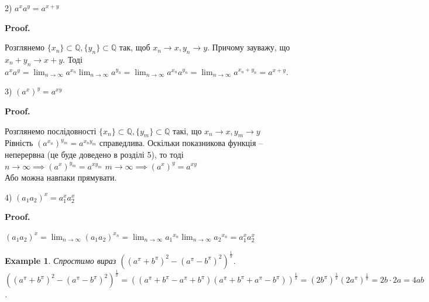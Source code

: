 \documentclass[a4paper, 14pt]{article}
\makeatletter
\def\qed{$\blacksquare$}
\theoremstyle{theoremdd}
\theoremstyle{theoremdd}
\theoremstyle{theoremdd}
\theoremstyle{theoremdd}
\newtheorem{example}[theorem]{Example}
\theoremstyle{theoremdd}
\theoremstyle{theoremdd}
\theoremstyle{theoremdd}
\theoremstyle{theoremdd}
\renewenvironment{proof}[1][Proof.\\]{\par
\pushQED{\hfill \qed}%
\normalfont \topsep6\p@\@plus6\p@\relax
\trivlist
\item\relax
{\bfseries
#1\@addpunct{.}}\hspace\labelsep\ignorespaces
}{%
\popQED\endtrivlist\@endpefalse
}
\makeatother
\begin{document}
2) $a^x a^y = a^{x+y}$
\begin{proof}
Розглянемо $\{x_n\} \subset \mathbb{Q}, \{y_n\} \subset \mathbb{Q}$ так, щоб $x_n \to x, y_n \to y$. Причому зауважу, що $x_n + y_n \to x +y$. Тоді $a^x a^y = \displaystyle\lim_{n \to \infty} a^{x_n} \displaystyle\lim_{n \to \infty} a^{y_n} = \displaystyle\lim_{n \to \infty} a^{x_n} a^{y_n} = \displaystyle\lim_{n \to \infty} a^{x_n+y_n} = a^{x+y}$.
\end{proof}

3) $(a^x)^y = a^{xy}$
\begin{proof}

Розглянемо послідовності $\{x_n\} \subset \mathbb{Q}, \{y_m\} \subset \mathbb{Q}$ такі, що $x_n \to x, y_m \to y$\\
Рівність $(a^{x_n})^{y_m} = a^{x_n y_m}$ справедлива. Оскільки показникова функція -- неперервна (це буде доведено в розділі 5), то тоді\\
$n \to \infty \implies (a^x)^{y_m} = a^{x y_m}$ \hspace{0.5cm} $m \to \infty \implies (a^x)^{y} = a^{xy}$\\
Або можна навпаки прямувати.
\end{proof}

4) $(a_1a_2)^x = a_1^x a_2^x$
\begin{proof}
$(a_1a_2)^x = \displaystyle\lim_{n \to \infty} (a_1a_2)^{x_n} = \displaystyle\lim_{n \to \infty} {a_1}^{x_n} \displaystyle\lim_{n \to \infty} {a_2}^{x_n} = a_1^x a_2^x$
\end{proof}

\begin{example}
Спростимо вираз $\left((a^\pi+b^\pi)^2-(a^\pi-b^\pi)^2 \right)^{\frac{1}{\pi}}$.\\
$\left((a^\pi+b^\pi)^2-(a^\pi-b^\pi)^2 \right)^{\frac{1}{\pi}} = ((a^\pi+b^\pi-a^\pi+b^\pi)(a^\pi+b^\pi+a^\pi-b^\pi))^{\frac{1}{\pi}} = (2b^{\pi})^{\frac{1}{\pi}}(2a^{\pi})^{\frac{1}{\pi}} = 2b \cdot 2a = 4ab$.
\end{example}
\end{document}
